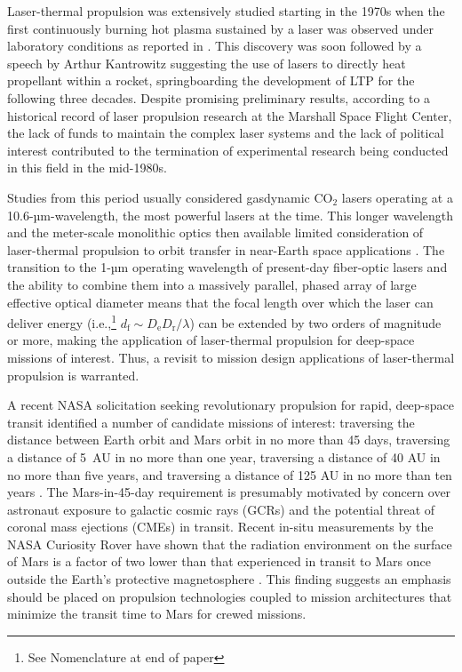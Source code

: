 \documentclass[final,3p,times,twocolumn,sort&compress, lefttitle]{elsarticle}
\begin{document}
        Laser-thermal propulsion was extensively studied starting in the 1970s when the first continuously burning hot plasma sustained by a laser was observed under laboratory conditions as reported in \cite{generalov_continuous_1970}. This discovery was soon followed by a speech by Arthur Kantrowitz \cite{kantrowitz_relevance_1971} suggesting the use of lasers to directly heat propellant within a rocket, springboarding the development of LTP for the following three decades. Despite promising preliminary results, according to a historical record \cite{jones_brief_2003} of laser propulsion research at the Marshall Space Flight Center, the lack of funds to maintain the complex laser systems and the lack of political interest contributed to the termination of experimental research being conducted in this field in the mid-1980s.
        
        Studies from this period usually considered gasdynamic CO$_2$ lasers operating at a 10.6-µm-wavelength, the most powerful lasers at the time. This longer wavelength and the meter-scale monolithic optics then available limited consideration of laser-thermal propulsion to orbit transfer in near-Earth space applications \cite{caveny_orbit-raising_1984}. The transition to the 1-µm operating wavelength of present-day fiber-optic lasers and the ability to combine them into a massively parallel, phased array of large effective optical diameter means that the focal length over which the laser can deliver energy (i.e.,\footnote{See Nomenclature at end of paper} $d_\mathrm{f} \sim D_\mathrm{e} D_\mathrm{r} / \lambda$) can be extended by two orders of magnitude or more, making the application of laser-thermal propulsion for deep-space missions of interest.
        Thus, a revisit to mission design applications of laser-thermal propulsion is warranted.
        
        A recent NASA solicitation seeking revolutionary propulsion for rapid, deep-space transit identified a number of candidate missions of interest: traversing the distance between Earth orbit and Mars orbit in no more than 45 days, traversing a distance of 5~AU in no more than one year, traversing a distance of 40 AU in no more than five years, and traversing a distance of 125 AU in no more than ten years \cite{national_aeronautics_and_space_administration_space_2018}. The Mars-in-45-day requirement is presumably motivated by concern over astronaut exposure to galactic cosmic rays (GCRs) and the potential threat of coronal mass ejections (CMEs) in transit. Recent in-situ measurements by the NASA Curiosity Rover have shown that the radiation environment on the surface of Mars is a factor of two lower than that experienced in transit to Mars once outside the Earth’s protective magnetosphere \cite{berger_long_2020}. This finding suggests an emphasis should be placed on propulsion technologies coupled to mission architectures that minimize the transit time to Mars for crewed missions.
        
\end{document}
